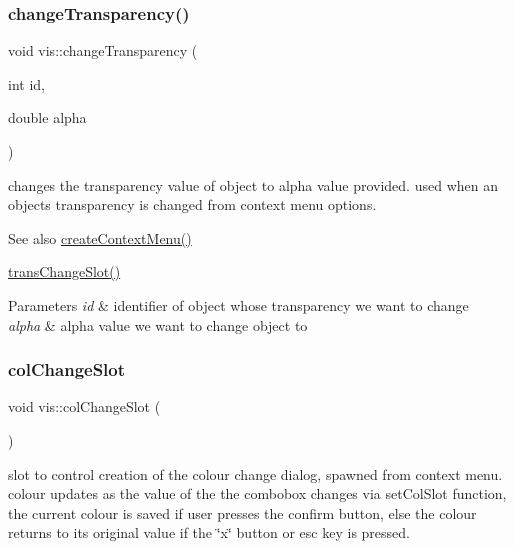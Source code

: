 \subsubsection{\texorpdfstring{change\+Transparency()}{changeTransparency()}}
{\footnotesize\ttfamily void vis\+::change\+Transparency (\begin{DoxyParamCaption}\item[{int}]{id,  }\item[{double}]{alpha }\end{DoxyParamCaption})}

changes the transparency value of object to alpha value provided. used when an objects transparency is changed from context menu options.

\begin{DoxySeeAlso}{See also}
\mbox{\hyperlink{classvis_a63af66f730f0f06f36d255bcc7a7a244}{create\+Context\+Menu()}} 

\mbox{\hyperlink{classvis_af2c43f4aaebe6ee5047e8eb9e9e8eedd}{trans\+Change\+Slot()}} 
\end{DoxySeeAlso}

\begin{DoxyParams}{Parameters}
{\em id} & identifier of object whose transparency we want to change \\
\hline
{\em alpha} & alpha value we want to change object to \\
\hline
\end{DoxyParams}
\mbox{\label{classvis_ad217326086a9f0cfc1e35df9c7ccf9c0}} 
\subsubsection{\texorpdfstring{col\+Change\+Slot}{colChangeSlot}}
{\footnotesize\ttfamily void vis\+::col\+Change\+Slot (\begin{DoxyParamCaption}{ }\end{DoxyParamCaption})\hspace{0.3cm}{\ttfamily [slot]}}

slot to control creation of the colour change dialog, spawned from context menu. colour updates as the value of the the combobox changes via set\+Col\+Slot function, the current colour is saved if user presses the confirm button, else the colour returns to its original value if the \char`\"{}x\char`\"{} button or esc key is pressed.

